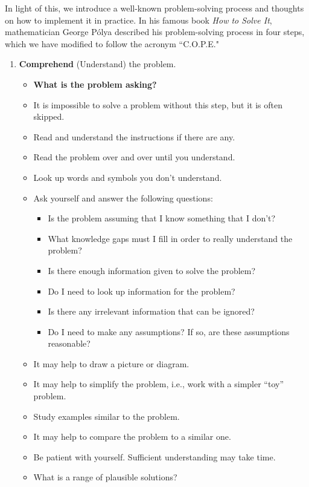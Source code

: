 In light of this, we introduce a well-known problem-solving process and thoughts on how to implement it in practice. In his famous book {\em How to Solve It}, mathematician George P\'{o}lya  described his problem-solving process in four steps, which we have modified to follow the acronym ``C.O.P.E."
\begin{enumerate}
\item {\bf Comprehend} (Understand) the problem.
\begin{itemize}
    \item {\bf What is the problem asking?}
    \item It is impossible to solve a problem without this step, but it is often skipped.
    \item Read and understand the instructions if there are any.
    \item Read the problem over and over until you understand.
    \item Look up words and symbols you don't understand.
    \item Ask yourself and answer the following questions:
    \begin{itemize}
        \item Is the problem assuming that I know something that I don't?
        \item What knowledge gaps must I fill in order to really understand the problem?
        \item Is there enough information given to solve the problem?
        \item Do I need to look up information for the problem?
        \item Is there any irrelevant information that can be ignored?
        \item Do I need to make any assumptions? If so, are these assumptions reasonable?
        \end{itemize}
    \item It may help to draw a picture or diagram.
    \item It may help to simplify the problem, i.e., work with a simpler ``toy'' problem.
    \item Study examples similar to the problem.
    \item It may help to compare the problem to a similar one.
    \item Be patient with yourself. Sufficient understanding may take time.
    \item What is a range of plausible solutions?

\end{itemize}
\end{enumerate}
